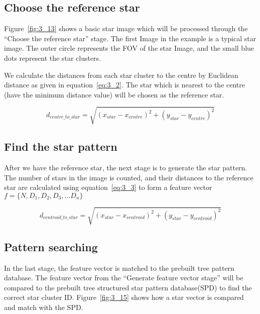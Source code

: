 \subsection{Choose the reference star}

Figure~\ref{fig:3_13} shows a basic star image which will be processed through the “Choose the reference star” stage. The first Image in the example is a typical star image. The outer circle represents the FOV of the star Image, and the small blue dots represent the star clusters. 


\noindent We calculate the distances from each star cluster to the centre by Euclidean distance as given in equation~\ref{eq:3_2}. The star which is nearest to the centre (have the minimum distance value) will be chosen as the reference star.

\begin{equation}
	d_{centre\_to\_star} = \sqrt{(x_{star} - x_{centre})^2 + (y_{star} - y_{centre})^2}
	\label{eq:3_2}
\end{equation}

\subsection{Find the star pattern}

After we have the reference star, the next stage is to generate the star pattern. The number of stars in the image is counted, and their distances to the reference star are calculated using equation~\ref{eq:3_3} to form a feature vector $f = \{N, D_1, D_2, D_3, … D_n\}$

\begin{equation}
	d_{centroid\_to\_star} = \sqrt{(x_{star} - x_{centroid})^2 + (y_{star} - y_{centroid})^2}
	\label{eq:3_3}
\end{equation}


\subsection{Pattern searching}

In the last stage, the feature vector is matched to the prebuilt tree pattern database. The feature vector from the “Generate feature vector stage” will be compared to the prebuilt tree structured star pattern database(SPD) to find the correct star cluster ID. Figure~\ref{fig:3_15} shows how a star vector is compared and match with the SPD. \\

